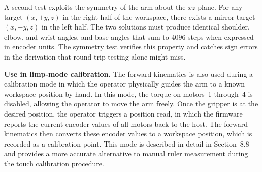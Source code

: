 A second test exploits the symmetry of the arm about the $xz$ 
plane. For any target $(x, +y, z)$ in the right half of the 
workspace, there exists a mirror target $(x, -y, z)$ in the left 
half. The two solutions must produce identical shoulder, elbow, 
and wrist angles, and base angles that sum to $4096$ steps when 
expressed in encoder units. The symmetry test verifies this 
property and catches sign errors in the derivation that 
round-trip testing alone might miss.

\textbf{Use in limp-mode calibration.} The forward kinematics is 
also used during a calibration mode in which the operator 
physically guides the arm to a known workspace position by hand. 
In this mode, the torque on motors~1 through~4 is disabled, 
allowing the operator to move the arm freely. Once the gripper 
is at the desired position, the operator triggers a position 
read, in which the firmware reports the current encoder values 
of all motors back to the host. The forward kinematics then 
converts these encoder values to a workspace position, which is 
recorded as a calibration point. This mode is described in detail 
in Section~8.8 and provides a more accurate alternative to manual 
ruler measurement during the touch calibration procedure.